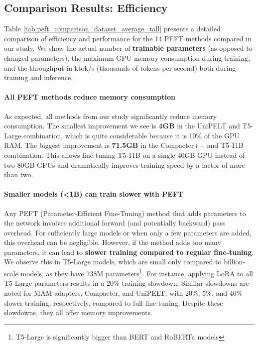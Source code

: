 \subsection{Comparison Results: Efficiency}
\label{sec:peft_comparison_efficiency}

Table \ref{tab:peft_comparison_dataset_average_tall} presents a detailed comparison of efficiency and performance for the 14 PEFT methods compared in our study. We show the actual number of \textbf{trainable parameters} (as opposed to changed parameters), the maximum GPU memory consumption during training, and the throughput in ktok/s (thousands of tokens per second) both during training and inference.

\paragraph{All PEFT methods reduce memory consumption}

As expected, all methods from our study significantly reduce memory consumption. The smallest improvement we see is \textbf{4GB} in the UniPELT and T5-Large combination, which is quite considerable because it is 10\% of the GPU RAM. The biggest improvement is \textbf{71.5GB} in the Compacter++ and T5-11B combination. This allows fine-tuning T5-11B on a single 40GB GPU instead of two 80GB GPUs and dramatically improves training speed by a factor of more than two.

\paragraph{Smaller models (<1B) can train slower with PEFT}

Any PEFT (Parameter-Efficient Fine-Tuning) method that adds parameters to the network involves additional forward (and potentially backward) pass overhead. For sufficiently large models or when only a few parameters are added, this overhead can be negligible. However, if the method adds too many parameters, it can lead to \textbf{slower training compared to regular fine-tuning}. We observe this in T5-Large models, which are small only compared to billion-scale models, as they have 738M parameters\footnote{T5-Large is significantly bigger than BERT and RoBERTa models}. For instance, applying LoRA to all T5-Large parameters results in a 20\% training slowdown. Similar slowdowns are noted for MAM adapters, Compacter, and UniPELT, with 20\%, 5\%, and 40\% slower training, respectively, compared to full fine-tuning. Despite these slowdowns, they all offer memory improvements.

